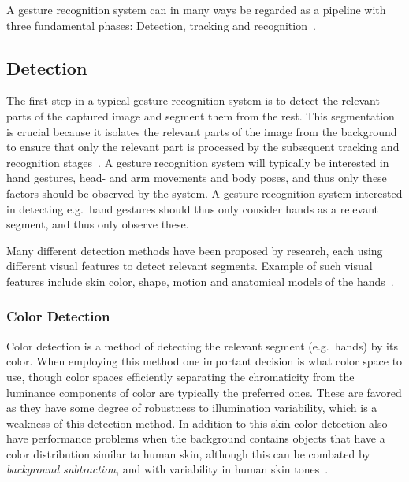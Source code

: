 
A gesture recognition system can in many ways be regarded as a pipeline with three fundamental phases: Detection, tracking and recognition~\citep{Rautaray2015}.


\subsection{Detection}
The first step in a typical gesture recognition system is to detect the relevant parts of the captured image and segment them from the rest. 
This segmentation is crucial because it isolates the relevant parts of the image from the background to ensure that only the relevant part is processed by the subsequent 
tracking and recognition stages~\citep{Cote2006}. 
A gesture recognition system will typically be interested in hand gestures, head- and arm movements and body poses, and thus only these factors should be observed by the system.
A gesture recognition system interested in detecting e.g.~hand gestures should thus only consider hands as a relevant segment, and thus only observe these.

Many different detection methods have been proposed by research, each using different visual features to detect relevant segments. 
Example of such visual features include skin color, shape, motion and anatomical models of the hands~\citep{Cote2006}.

\subsubsection{Color Detection} 
Color detection is a method of detecting the relevant segment (e.g.~hands) by its color. 
When employing this method one important decision is what color space to use, though color spaces efficiently separating the chromaticity from
the luminance components of color are typically the preferred ones. These are favored as they have some degree of robustness to illumination variability, which
is a weakness of this detection method. In addition to this skin color detection also have performance problems when the background contains objects that have a 
color distribution similar to human skin, although this can be combated by \textit{background subtraction}, and with variability in human skin tones~\citep{Rautaray2015}.

